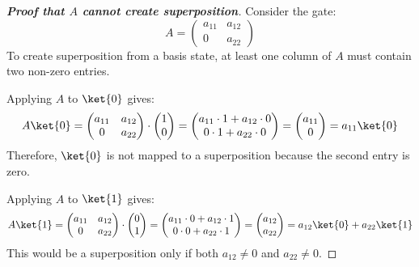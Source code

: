 \highspace
\begin{proof}[\textbf{Proof that $A$ cannot create superposition}]
    Consider the gate:
    \begin{equation*}
        A =
        \begin{pmatrix}
            a_{11} & a_{12} \\
            0      & a_{22}
        \end{pmatrix}
    \end{equation*}
    To create superposition from a basis state, at least one column of $A$ must contain two non-zero entries.

    \highspace
    Applying $A$ to $\ket{0}$ gives:
    \begin{equation*}
        A\ket{0}
        =
        \begin{pmatrix}
            a_{11} & a_{12} \\
            0      & a_{22}
        \end{pmatrix} \cdot \begin{pmatrix}
            1 \\ 0
        \end{pmatrix}
        =
        \begin{pmatrix}
            a_{11} \cdot 1 + a_{12} \cdot 0 \\
            0 \cdot 1 + a_{22} \cdot 0
        \end{pmatrix}
        =
        \begin{pmatrix}
            a_{11} \\
            0
        \end{pmatrix}
        =
        a_{11}\ket{0}
    \end{equation*}
    Therefore, $\ket{0}$ is not mapped to a superposition because the second entry is zero.

    \highspace
    Applying $A$ to $\ket{1}$ gives:
    \begin{equation*}
        A\ket{1}
        =
        \begin{pmatrix}
            a_{11} & a_{12} \\
            0      & a_{22}
        \end{pmatrix} \cdot \begin{pmatrix}
            0 \\ 1
        \end{pmatrix}
        =
        \begin{pmatrix}
            a_{11} \cdot 0 + a_{12} \cdot 1 \\
            0 \cdot 0 + a_{22} \cdot 1
        \end{pmatrix}
        =
        \begin{pmatrix}
            a_{12} \\
            a_{22}
        \end{pmatrix}
        =
        a_{12}\ket{0} + a_{22}\ket{1}
    \end{equation*}
    This would be a superposition only if both $a_{12} \neq 0$ and $a_{22} \neq 0$.


\end{proof}
